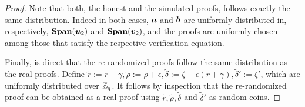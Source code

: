 \begin{proof}
Note that both, the honest and the simulated proofs, follows exactly the same distribution. Indeed in both cases, ${\boldsymbol{a}}$ and ${\boldsymbol{b}}$ are uniformly distributed in, respectively, $\mathbf{Span}({\boldsymbol{u}}_2)$ and $\mathbf{Span}({\boldsymbol{v}}_2)$, and the proofs are uniformly chosen among those that satisfy the respective verification equation.

Finally, is direct that the re-randomized proofs follow the same distribution as the real proofs.
Define $\tilde{r} := r + \gamma,\tilde{\rho} := \rho+\epsilon,\tilde{\delta} := \zeta-\epsilon(r+\gamma), \tilde{\delta}' := \zeta'$, which are uniformly distributed over $\mathbb{Z}_q$.
It follows by inspection that the re-randomized proof can be obtained as a real proof using $\tilde{r},\tilde{\rho},\tilde{\delta}$ and $\tilde{\delta}'$ as random coins.
\end{proof} 

